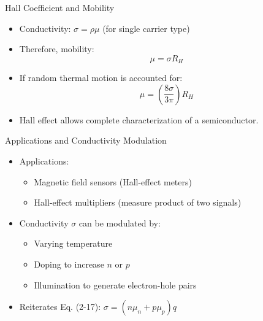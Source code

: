 \begin{frame}{Hall Coefficient and Mobility}
    \begin{itemize}
        \item Conductivity: $\sigma = \rho \mu$ (for single carrier type)
        \item Therefore, mobility:
        \begin{equation}
        \mu = \sigma R_H \tag{2-26}
        \end{equation}
        \item If random thermal motion is accounted for:
        \begin{equation}
        \mu = \left( \frac{8\sigma}{3\pi} \right) R_H
        \end{equation}
        \item Hall effect allows complete characterization of a semiconductor.
    \end{itemize}
\end{frame}

\begin{frame}{Applications and Conductivity Modulation}
    \begin{itemize}
        \item Applications:
        \begin{itemize}
            \item Magnetic field sensors (Hall-effect meters)
            \item Hall-effect multipliers (measure product of two signals)
        \end{itemize}
        \item Conductivity $\sigma$ can be modulated by:
        \begin{itemize}
            \item Varying temperature
            \item Doping to increase $n$ or $p$
            \item Illumination to generate electron-hole pairs
        \end{itemize}
        \item Reiterates Eq. (2-17): $\sigma = (n\mu_n + p\mu_p)q$
    \end{itemize}
\end{frame}


